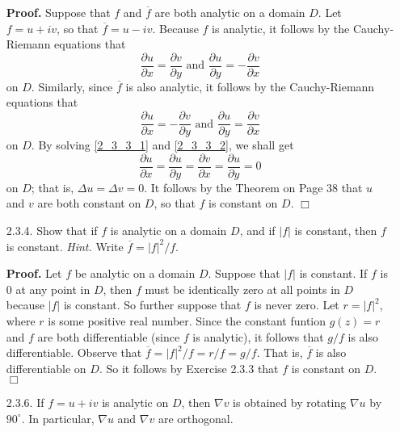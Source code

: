 \documentclass[9pt]{article}
\newcommand{\qed}{\hfill \ensuremath{\Box}}
\begin{document}
\begin{enumerate}
      \textbf{Proof.} Suppose that $f$ and $\overline{f}$ are both analytic on a
      domain $D$. Let $f = u + iv$, so that $\overline{f} = u - iv$. Because
      $f$ is analytic, it follows by the Cauchy-Riemann equations that
      \begin{equation} \label{2_3_3_1}
         \frac{\partial u}{\partial x} = \frac{\partial v}{\partial y}
            \text{ and }
         \frac{\partial u}{\partial y} = -\frac{\partial v}{\partial x}
      \end{equation}
      on $D$. Similarly, since  $\overline{f}$ is also analytic, it follows
      by the Cauchy-Riemann equations that
      \begin{equation} \label{2_3_3_2}
      \frac{\partial u}{\partial x} = -\frac{\partial v}{\partial y}
        \text{ and }
        \frac{\partial u}{\partial y} = \frac{\partial v}{\partial x}
      \end{equation}
      on $D$. By solving \eqref{2_3_3_1} and \eqref{2_3_3_2}, we shall get
      $$\frac{\partial u}{\partial x} = \frac{\partial u}{\partial y} =
        \frac{\partial v}{\partial x} = \frac{\partial u}{\partial y} = 0$$
      on $D$; that is, $\Delta u = \Delta v = 0$. It follows by the Theorem on
      Page 38 that $u$ and $v$ are both constant on $D$, so that $f$ is constant
      on $D$. \qed
   \item[2.3.4.]  Show that if $f$ is analytic on a domain $D$, and if $|f|$ is
                  constant, then $f$ is constant. \textit{Hint.} Write
                  $\overline{f} = |f|^2/f$.
                  
      \textbf{Proof.} Let $f$ be analytic on a domain $D$. Suppose that $|f|$ is
      constant. If $f$ is 0 at any point in $D$, then $f$ must be identically
      zero at all points in $D$ because $|f|$ is constant. So further suppose
      that $f$ is never zero. Let $r = |f|^2$, where $r$ is some positive
      real number. Since the constant funtion $g(z) = r$ and $f$ are both
      differentiable (since $f$ is analytic), it follows that $g/f$ is also
      differentiable. Observe that $\overline{f} = |f|^2/f = r/f = g/f$. That
      is, $\overline{f}$ is also differentiable on $D$. So it follows by
      Exercise 2.3.3 that $f$ is constant on $D$. \mbox{ }\qed
   \item[2.3.6.]  If $f = u + iv$ is analytic on $D$, then $\nabla v$ is
                  obtained by rotating $\nabla u$ by $90^\circ$. In particular,
                  $\nabla u$ and $\nabla v$ are orthogonal.
                  

\end{enumerate}
\end{document}
